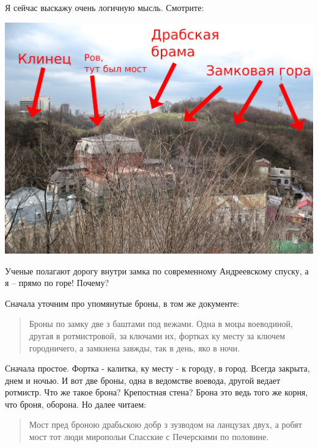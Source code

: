 Я сейчас выскажу очень логичную мысль. Смотрите:

\begin{center}
\includegraphics[width=\linewidth]{chast-colebanie-osnov/gora-zamkovaya-valovaya/zamok-scheme.jpg}
\end{center}


Ученые полагают дорогу внутри замка по современному Андреевскому спуску, а я – прямо по горе! Почему?

Сначала уточним про упомянутые броны, в том же документе:

\begin{quotation}
Броны по замку две з баштами под вежами. Одна в моцы воеводиной, другая в ротмистровой, за ключами их, фортках ку месту за ключем городничего, а замкнена завжды, так в день, яко в ночи.
\end{quotation}

Сначала простое. Фортка - калитка, ку месту - к городу, в город. Всегда закрыта, днем и ночью. И вот две броны, одна в ведомстве воевода, другой ведает ротмистр. Что же такое брона? Крепостная стена? Брона это ведь того же корня, что броня, оборона. Но далее читаем:

\begin{quotation}
Мост пред броною драбьскою добр з зузводом на ланцузах двух, а робят мост тот люди миропольи Спасские с Печерскими по половине.
\end{quotation}

